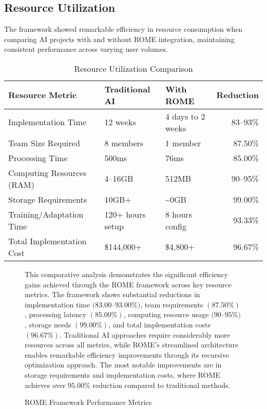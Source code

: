 \documentclass[12pt]{article}
\begin{document}
\subsection{Resource Utilization}
The framework showed remarkable efficiency in resource consumption when comparing AI projects with and without ROME integration, maintaining consistent performance across varying user volumes.

\begin{table}[h]
\caption{Resource Utilization Comparison}
\begin{center}
\begin{tabular}{|l|l|l|r|}
\hline
\textbf{Resource Metric} & \textbf{Traditional AI} & \textbf{With ROME} & \textbf{Reduction} \\
\hline
Implementation Time & 12 weeks & 4 days to 2 weeks & 83--93\% \\
Team Size Required & 8 members & 1 member & 87.50\% \\
Processing Time & 500ms & 76ms & 85.00\% \\
Computing Resources (RAM) & 4--16GB & 512MB & 90--95\% \\
Storage Requirements & 10GB+ & \textasciitilde{}0GB & 99.00\% \\
Training/Adaptation Time & 120+ hours setup & 8 hours config & 93.33\% \\
Total Implementation Cost & \$144,000+ & \$4,800+ & 96.67\% \\
\hline
\end{tabular}
\end{center}
\label{tab:resource-utilization}
\end{table}

\begin{figure}[h]
\caption{ROME Framework Performance Metrics}
This comparative analysis demonstrates the significant efficiency gains achieved through the ROME framework across key resource metrics. The framework shows substantial reductions in implementation time $(83.00$--$93.00\%)$, team requirements $(87.50\%)$, processing latency $(85.00\%)$, computing resource usage $(90$--$95\%)$, storage needs $(99.00\%)$, and total implementation costs $(96.67\%)$. Traditional AI approaches require considerably more resources across all metrics, while ROME's streamlined architecture enables remarkable efficiency improvements through its recursive optimization approach. The most notable improvements are in storage requirements and implementation costs, where ROME achieves over $95.00\%$ reduction compared to traditional methods.
\end{figure}
\end{document}
